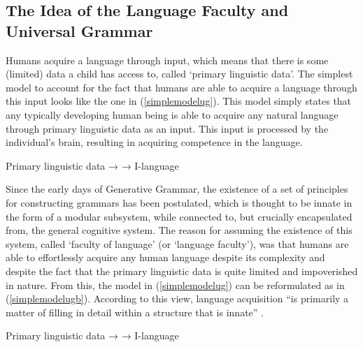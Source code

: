 \subsection{The Idea of the Language Faculty and Universal Grammar}
Humans acquire a language through input, which means that there is some (limited) data a child has access to, called `primary linguistic data'. The simplest model to account for the fact that humans are able to acquire a language through this input looks like the one in (\ref{simplemodelug}). This model simply states that any typically developing human being is able to acquire any natural language through primary linguistic data as an input. This input is processed by the individual's brain, resulting in acquiring competence in the language. 

\begin{exe}
\ex\label{simplemodelug} Primary linguistic data →  → I-language
\end{exe}

\noindent Since the early days of Generative Grammar, the existence of a set of principles for constructing grammars has been postulated, which is thought to be innate in the form of a modular subsystem, while connected to, but crucially encapsulated from, the general cognitive system. The reason for assuming the existence of this system, called `faculty of language' (or `language faculty'), was that humans are able to effortlessly acquire any human language despite its complexity and despite the fact that the primary linguistic data is quite limited and impoverished in nature. From this, the model in (\ref{simplemodelug}) can be reformulated as in (\ref{simplemodelugb}). According to this view, language acquisition ``is primarily a matter of filling in detail within a structure that is innate'' \citep[39]{chomsky1975reflections}.

\begin{exe}
\ex\label{simplemodelugb} Primary linguistic data →  → I-language
\end{exe}

